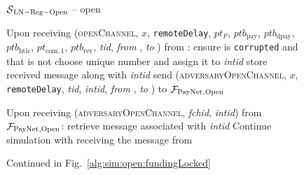 \begin{figure}[!htbp]
\begin{simulatorbox}{$\mathcal{S}{}_{\mathrm{LN - Reg - Open}}$ -- open}
\begin{algorithmic}[1]
      \State Upon receiving (\textsc{openChannel}, $x$, \texttt{remoteDelay},
      $pt_F$, $ptb_{\mathrm{pay}}$, $ptb_{\mathrm{dpay}}$,
      $ptb_{\mathrm{htlc}}$, $pt_{\mathrm{com}, 1}$, $ptb_{\mathrm{rev}}$,
      \textit{tid}, \textit{from} \alice, \textit{to} \bob) from \adversary{}:
      \label{alg:sim:open:adv}
      \Indent
        \State ensure \alice{} is \texttt{corrupted} and that \bob{} is not
        \State choose unique number and assign it to \textit{intid}
        \State store received message along with \textit{intid}
        \State send (\textsc{adversaryOpenChannel}, $x$, \texttt{remoteDelay},
        \textit{tid}, \textit{intid}, \textit{from} \alice, \textit{to} \bob)
        to $\mathcal{F}_{\mathrm{PayNet}}{}_{\mathrm{, Open}}$
        \label{alg:sim:open:adv:send}
      \EndIndent
      \Statex

      \State Upon receiving (\textsc{adversaryOpenChannel}, \textit{fchid},
      \textit{intid}) from $\mathcal{F}_{\mathrm{PayNet}}{}_{\mathrm{, Open}}$:
      \label{alg:sim:open:adv:recv}
      \Indent
        \State retrieve message associated with \textit{intid}
        \State Continue simulation with \alice{} receiving the message from \bob
        \label{alg:sim:open:adv:cont}
      \EndIndent
    \end{algorithmic}
    Continued in Fig.~\ref{alg:sim:open:fundingLocked}
  \end{simulatorbox}
  \caption{}
  \label{alg:sim:open}
\end{figure}

